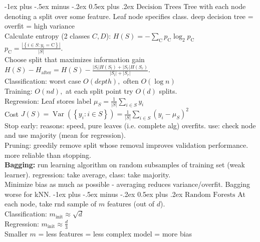 \documentclass[10pt,landscape]{article}
\makeatletter
\renewcommand{\section}{\@startsection{section}{1}{0mm}%
                                {-1ex plus -.5ex minus -.2ex}%
                                {0.5ex plus .2ex}%
                                {\normalfont\large\bfseries}}
\makeatother
\begin{document}
\begin{multicols}{3}
\section{$\boxed{\text{Decision Trees}}$}
Tree with each node denoting a split over some feature. Leaf node specifies class. 
deep decision tree = overfit = high variance \\
Calculate entropy (2 classes $C,D$): $H(S)=-\sum_{\mathrm{C}} p_{\mathrm{C}} \log _2 p_{\mathrm{C}}$ \\ 
$p_{\mathrm{C}}=\frac{\left|\left\{i \in S: y_i=\mathrm{C}\right\}\right|}{|S|}$.\\ Choose split that maximizes information gain $H(S)-H_{\mathrm{after}}=H(S)-\frac{\left|S_l\right| H\left(S_l\right)+\left|S_r\right| H\left(S_r\right)}{\left|S_l\right|+\left|S_r\right|}.$
\\
Classification: worst case $O(depth),$ often $O(\log n)$\\
Training: $O(nd),$ at each split point try $O(d)$ splits.\\
Regression: Leaf stores label $\mu_S=\frac{1}{|S|} \sum_{i \in S} y_i$\\
Cost $J(S)=\operatorname{Var}\left(\left\{y_i: i \in S\right\}\right)=\frac{1}{|S|} \sum_{i \in S}\left(y_i-\mu_S\right)^2$\\
Stop early: reasons: speed, pure leaves (i.e. complete alg) overfits. use: check node and use majority (mean for regression).\\
Pruning: greedily remove split whose removal improves validation performance. more reliable than stopping.\\
\textbf{Bagging:} run learning algorithm on random subsamples of training set (weak learner). regression: take average, class: take majority.\\
Minimize bias as much as possible - averaging reduces variance/overfit. Bagging worse for kNN.
\section{$\boxed{\text{Random Forests}}$}
At each node, take rnd sample of $m$ features (out of $d$).\\
Classification: $m_{\text{init}}\approx\sqrt d$
\\
Regression: $m_{\text{init}}\approx\frac d3$
\\
Smaller $m$ = less features = less complex model = more bias


\end{multicols}
\end{document}
